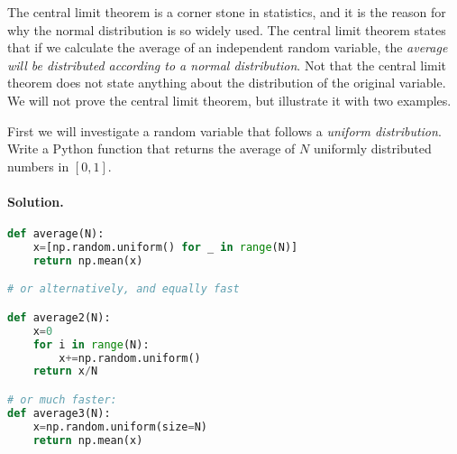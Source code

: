 \documentclass[graybox,sectrefs,envcountresetchap,open=right,final]{svmonodo}
\makeatletter
\newenvironment{doconceexercise}{}{}
\newcounter{doconceexercisecounter}%
\newcommand\listofexercises{
\chapter*{List of Exercises
          \@mkboth{List of Exercises}{List of Exercises}}
\markboth{List of Exercises}{List of Exercises}
\@starttoc{loe}
}
\makeatother
\begin{document}
\begin{doconceexercise}

                             
\label{ex:mc:norm}

The central limit theorem is a corner stone in statistics, and it is
the reason for why the normal distribution is so widely used. The
central limit theorem states that if we calculate the average of an
independent random variable, the \emph{average will be distributed
according to a normal distribution}. Not that the central limit
theorem does not state anything about the distribution of the original
variable. We will not prove the central limit theorem, but illustrate
it with two examples. 



First we will investigate a random variable that follows a \emph{uniform
distribution}. Write a Python function that returns the average of
$N$ uniformly distributed numbers in $[0,1]$.

\paragraph{Solution.}

















\begin{lstlisting}[language=python,style=blue1]
def average(N):
    x=[np.random.uniform() for _ in range(N)]
    return np.mean(x)

# or alternatively, and equally fast

def average2(N):
    x=0
    for i in range(N):
        x+=np.random.uniform()
    return x/N

# or much faster:
def average3(N):
    x=np.random.uniform(size=N)
    return np.mean(x)

\end{lstlisting}



\end{doconceexercise}
\end{document}
